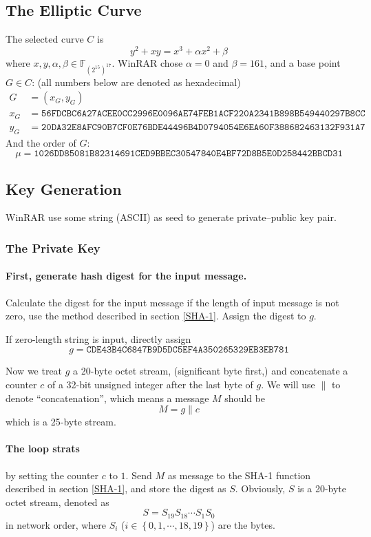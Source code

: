 \documentclass[oneside]{article}
\begin{document}
\subsection{The Elliptic Curve}\label{curve}
The selected curve $C$ is
\[y^2+xy=x^3+\alpha x^2+\beta\]
where $x, y, \alpha, \beta\in\mathbb{F}_{\left(2^{15}\right)^{17}}$. WinRAR chose $\alpha=0$ and $\beta=161$, and a base point $G\in C$: (all numbers below are denoted as hexadecimal)
\begin{align*}
      G   & = \left(x_G, y_G\right)                                                     \\
      x_G & = \mathtt{56FDCBC6A27ACEE0CC2996E0096AE74FEB1ACF220A2341B898B549440297B8CC} \\
      y_G & = \mathtt{20DA32E8AFC90B7CF0E76BDE44496B4D0794054E6EA60F388682463132F931A7}
\end{align*}
And the order of $G$:
\[\mu=\mathtt{1026DD85081B82314691CED9BBEC30547840E4BF72D8B5E0D258442BBCD31}\]

\subsection{Key Generation}\label{key-gen}
WinRAR use some string (ASCII) as seed to generate private--public key pair.

\subsubsection{The Private Key}
\paragraph{First, generate hash digest for the input message.}
Calculate the digest for the input message if the length of input message is not zero, use the method described in section \ref{SHA-1}. Assign the digest to $g$.

If zero-length string is input, directly assign
\[g=\mathtt{CDE43B4C6847B9D5DC5EF4A350265329EB3EB781}\]

Now we treat $g$ a 20-byte octet stream, (significant byte first,) and concatenate a counter $c$ of a 32-bit unsigned integer after the last byte of $g$.
We will use $\parallel$ to denote ``concatenation'', which means a message $M$ should be
\[M=g\parallel c\]
which is a 25-byte stream.

\paragraph{The loop strats} by setting the counter $c$ to $1$. Send $M$ as message to the SHA-1 function described in section \ref{SHA-1}, and store the digest as $S$.
Obviously, $S$ is a 20-byte octet stream, denoted as
\[S=S_{19}S_{18}\cdots S_1S_0\]
in network order, where $S_i$ ($i\in\left\{0,1,\cdots,18,19\right\}$) are the bytes.
\end{document}
